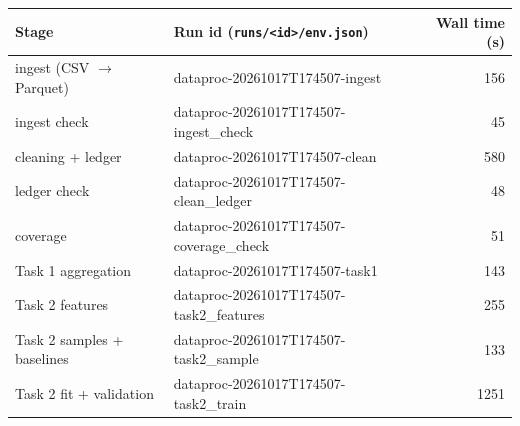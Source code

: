 \begin{tabular}{llr}
\toprule
Stage & Run id (\texttt{runs/<id>/env.json}) & Wall time (s) \\
\midrule
ingest (CSV $\to$ Parquet) & dataproc-20261017T174507-ingest & 156 \\
ingest check & dataproc-20261017T174507-ingest\_check & 45 \\
cleaning + ledger & dataproc-20261017T174507-clean & 580 \\
ledger check & dataproc-20261017T174507-clean\_ledger & 48 \\
coverage & dataproc-20261017T174507-coverage\_check & 51 \\
Task 1 aggregation & dataproc-20261017T174507-task1 & 143 \\
Task 2 features & dataproc-20261017T174507-task2\_features & 255 \\
Task 2 samples + baselines & dataproc-20261017T174507-task2\_sample & 133 \\
Task 2 fit + validation & dataproc-20261017T174507-task2\_train & 1251 \\
\bottomrule
\end{tabular}
